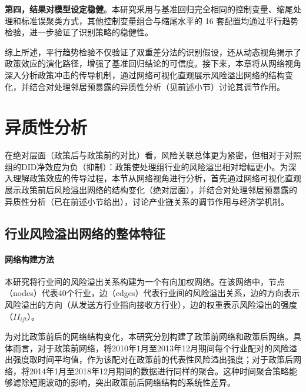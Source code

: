 \textbf{第四，结果对模型设定稳健}。本研究采用与基准回归完全相同的控制变量、缩尾处理和标准误聚类方式，其他控制变量组合与缩尾水平的 16 套配置均通过平行趋势检验，进一步验证了识别策略的稳健性。

综上所述，平行趋势检验不仅验证了双重差分法的识别假设，还从动态视角揭示了政策效应的演化路径，增强了基准回归结论的可信度。接下来，本章将从网络视角深入分析政策冲击的传导机制，通过网络可视化直观展示风险溢出网络的结构变化，并结合对处理邻居预暴露的异质性分析（见前述小节）讨论其调节作用。



\section{异质性分析}
\label{sec:network_analysis}



在绝对层面（政策后与政策前的对比）看，风险关联总体更为紧密，但相对于对照组的DID净效应为负（抑制）：政策使处理组行业的风险溢出相对增幅更小。为深入理解政策效应的传导过程，本节从网络视角进行分析，首先通过网络可视化直观展示政策前后风险溢出网络的结构变化（绝对层面），并结合对处理邻居预暴露的异质性分析（已在前述小节给出），讨论产业链关系的调节作用与经济学机制。



\subsection{行业风险溢出网络的整体特征}

\paragraph{网络构建方法}

本研究将行业间的风险溢出关系构建为一个有向加权网络。在该网络中，节点（nodes）代表40个行业，边（edges）代表行业间的风险溢出关系，边的方向表示风险溢出的方向（从发送方行业指向接收方行业），边的权重表示风险溢出的强度（$II_{ijt}$）。

为对比政策前后的网络结构变化，本研究分别构建了政策前网络和政策后网络。具体而言，对于政策前网络，将2010年1月至2013年12月期间每个行业配对的风险溢出强度取时间平均值，作为该配对在政策前的代表性风险溢出强度；对于政策后网络，将2014年1月至2018年12月期间的数据进行同样的聚合。这种时间聚合策略能够滤除短期波动的影响，突出政策前后网络结构的系统性差异\citep{acemoglu2012network,Yang2023TailRiskIO}。

